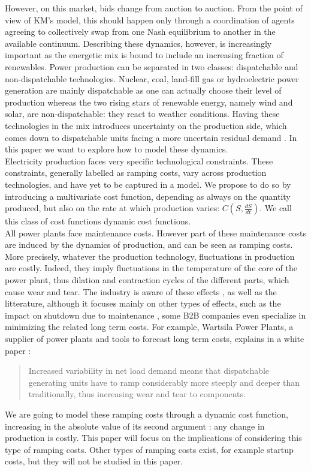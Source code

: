 However, on this market, bids change from auction to auction. From the point of view of KM's model, this should happen only through a coordination of agents agreeing to collectively swap from one Nash equilibrium to another in the available continuum. Describing these dynamics, however, is increasingly important as the energetic mix is bound to include an increasing fraction of renewables. Power production can be separated in two classes: dispatchable and non-dispatchable technologies. Nuclear, coal, land-fill gas or hydroelectric power generation are mainly dispatchable as one can actually choose their level of production whereas the two rising stars of renewable energy, namely wind and solar, are non-dispatchable: they react to weather conditions. Having these technologies in the mix introduces uncertainty on the production side, which comes down to dispatchable units facing a more uncertain residual demand \cite{Boyle}. In this paper we want to explore how to model these dynamics. \\

Electricity production faces very specific technological constraints. These constraints, generally labelled as ramping costs, vary across production technologies, and have yet to be captured in a model. We propose to do so by introducing a multivariate cost function, depending as always on the quantity produced, but also on the rate at which production varies: $C(S,\frac{dS}{dt})$. We call this class of cost functions dynamic cost functions.\\

All power plants face maintenance costs. However part of these maintenance costs are induced by the dynamics of production, and can be seen as ramping costs. More precisely, whatever the production technology, fluctuations in production are costly. Indeed, they imply fluctuations in the temperature of the core of the power plant, thus dilation and contraction cycles of the different parts, which cause wear and tear. The industry is aware of these effects \cite{GE}, as well as the litterature, although it focuses mainly on other types of effects, such as the impact on shutdown due to maintenance \cite{rothwell1995dynamic}, some B2B companies even specialize in minimizing the related long term costs. For example, Wartsila Power Plants, a supplier of power plants and tools to forecast long term costs, explains in a white paper \cite{Arima}: 
\begin{quote}
Increased variability in net load demand means that dispatchable generating units have to ramp considerably more steeply and deeper than traditionally, thus increasing wear and tear to components.
\end{quote}
We are going to model these ramping costs through a dynamic cost function, increasing in the absolute value of its second argument : any change in production is costly. This paper will focus on the implications of considering this type of ramping costs. Other types of ramping costs exist, for example startup costs, but they will not be studied in this paper. \\

